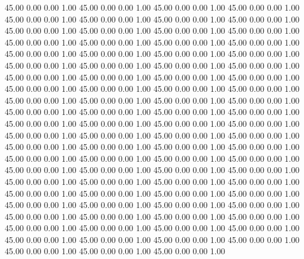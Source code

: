    45.00   0.00   0.00   1.00
   45.00   0.00   0.00   1.00
   45.00   0.00   0.00   1.00
   45.00   0.00   0.00   1.00
   45.00   0.00   0.00   1.00
   45.00   0.00   0.00   1.00
   45.00   0.00   0.00   1.00
   45.00   0.00   0.00   1.00
   45.00   0.00   0.00   1.00
   45.00   0.00   0.00   1.00
   45.00   0.00   0.00   1.00
   45.00   0.00   0.00   1.00
   45.00   0.00   0.00   1.00
   45.00   0.00   0.00   1.00
   45.00   0.00   0.00   1.00
   45.00   0.00   0.00   1.00
   45.00   0.00   0.00   1.00
   45.00   0.00   0.00   1.00
   45.00   0.00   0.00   1.00
   45.00   0.00   0.00   1.00
   45.00   0.00   0.00   1.00
   45.00   0.00   0.00   1.00
   45.00   0.00   0.00   1.00
   45.00   0.00   0.00   1.00
   45.00   0.00   0.00   1.00
   45.00   0.00   0.00   1.00
   45.00   0.00   0.00   1.00
   45.00   0.00   0.00   1.00
   45.00   0.00   0.00   1.00
   45.00   0.00   0.00   1.00
   45.00   0.00   0.00   1.00
   45.00   0.00   0.00   1.00
   45.00   0.00   0.00   1.00
   45.00   0.00   0.00   1.00
   45.00   0.00   0.00   1.00
   45.00   0.00   0.00   1.00
   45.00   0.00   0.00   1.00
   45.00   0.00   0.00   1.00
   45.00   0.00   0.00   1.00
   45.00   0.00   0.00   1.00
   45.00   0.00   0.00   1.00
   45.00   0.00   0.00   1.00
   45.00   0.00   0.00   1.00
   45.00   0.00   0.00   1.00
   45.00   0.00   0.00   1.00
   45.00   0.00   0.00   1.00
   45.00   0.00   0.00   1.00
   45.00   0.00   0.00   1.00
   45.00   0.00   0.00   1.00
   45.00   0.00   0.00   1.00
   45.00   0.00   0.00   1.00
   45.00   0.00   0.00   1.00
   45.00   0.00   0.00   1.00
   45.00   0.00   0.00   1.00
   45.00   0.00   0.00   1.00
   45.00   0.00   0.00   1.00
   45.00   0.00   0.00   1.00
   45.00   0.00   0.00   1.00
   45.00   0.00   0.00   1.00
   45.00   0.00   0.00   1.00
   45.00   0.00   0.00   1.00
   45.00   0.00   0.00   1.00
   45.00   0.00   0.00   1.00
   45.00   0.00   0.00   1.00
   45.00   0.00   0.00   1.00
   45.00   0.00   0.00   1.00
   45.00   0.00   0.00   1.00
   45.00   0.00   0.00   1.00
   45.00   0.00   0.00   1.00
   45.00   0.00   0.00   1.00
   45.00   0.00   0.00   1.00
   45.00   0.00   0.00   1.00
   45.00   0.00   0.00   1.00
   45.00   0.00   0.00   1.00
   45.00   0.00   0.00   1.00
   45.00   0.00   0.00   1.00
   45.00   0.00   0.00   1.00
   45.00   0.00   0.00   1.00
   45.00   0.00   0.00   1.00
   45.00   0.00   0.00   1.00
   45.00   0.00   0.00   1.00
   45.00   0.00   0.00   1.00
   45.00   0.00   0.00   1.00
   45.00   0.00   0.00   1.00
   45.00   0.00   0.00   1.00
   45.00   0.00   0.00   1.00
   45.00   0.00   0.00   1.00
